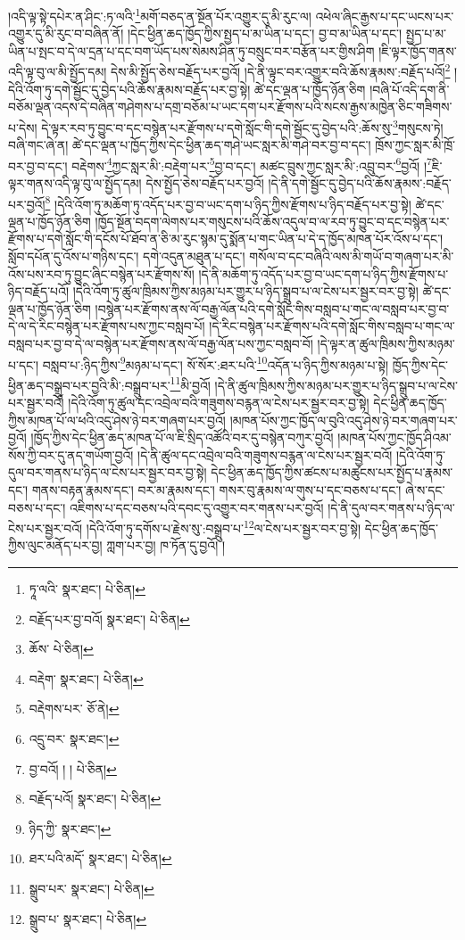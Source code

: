 །འདི་ལྟ་སྟེ་དཔེར་ན་ཤིང་:ཏ་ལའི་\footnote{ཏཱ་ལའི་  སྣར་ཐང་།  པེ་ཅིན། }མགོ་བཅད་ན་སྔོན་པོར་འགྱུར་དུ་མི་རུང་ལ། འཕེལ་ཞིང་རྒྱས་པ་དང་ཡངས་པར་འགྱུར་དུ་མི་རུང་བ་བཞིན་ནོ། །དེང་ཕྱིན་ཆད་ཁྱོད་ཀྱིས་སྤྱད་པ་མ་ཡིན་པ་དང་། བྱ་བ་མ་ཡིན་པ་དང་། སྤྱད་པ་མ་ཡིན་པ་སྤང་བ་དེ་ལ་དྲན་པ་དང་བག་ཡོད་པས་སེམས་ཤིན་ཏུ་བསྲུང་བར་བརྩོན་པར་གྱིས་ཤིག །ཇི་ལྟར་ཁྱོད་གནས་འདི་ལྟ་བུ་ལ་མི་སྤྱོད་དམ། དེས་མི་སྤྱོད་ཅེས་བརྗོད་པར་བྱའོ། །དེ་ནི་ལྟུང་བར་འགྱུར་བའི་ཆོས་རྣམས་:བརྗོད་པའོ།\footnote{བརྗོད་པར་བྱ་བའོ།  སྣར་ཐང་།  པེ་ཅིན། } །དེའི་འོག་ཏུ་དགེ་སྦྱོང་དུ་བྱེད་པའི་ཆོས་རྣམས་བརྗོད་པར་བྱ་སྟེ། ཚེ་དང་ལྡན་པ་ཁྱོད་ཉོན་ཅིག །བཞི་པོ་འདི་དག་ནི་བཅོམ་ལྡན་འདས་དེ་བཞིན་གཤེགས་པ་དགྲ་བཅོམ་པ་ཡང་དག་པར་རྫོགས་པའི་སངས་རྒྱས་མཁྱེན་ཅིང་གཟིགས་པ་དེས། དེ་ལྟར་རབ་ཏུ་བྱུང་བ་དང་བསྙེན་པར་རྫོགས་པ་དགེ་སློང་གི་དགེ་སྦྱོང་དུ་བྱེད་པའི་:ཆོས་སུ་\footnote{ཆོས་  པེ་ཅིན། }གསུངས་ཏེ། བཞི་གང་ཞེ་ན། ཚེ་དང་ལྡན་པ་ཁྱོད་ཀྱིས་དེང་ཕྱིན་ཆད་གཤེ་ཡང་སླར་མི་གཤེ་བར་བྱ་བ་དང་། ཁྲོས་ཀྱང་སླར་མི་ཁྲོ་བར་བྱ་བ་དང་། བརྡེགས་\footnote{བརྡེག་  སྣར་ཐང་།  པེ་ཅིན། }ཀྱང་སླར་མི་:བརྡེག་པར་\footnote{བརྡེགས་པར་  ཅོ་ནེ། }བྱ་བ་དང་། མཚང་བྲུས་ཀྱང་སླར་མི་:འབྲུ་བར་\footnote{འདྲུ་བར་  སྣར་ཐང་། }བྱའོ། །\footnote{བྱ་བའོ། ། །  པེ་ཅིན། }ཇི་ལྟར་གནས་འདི་ལྟ་བུ་ལ་སྤྱོད་དམ། དེས་སྤྱོད་ཅེས་བརྗོད་པར་བྱའོ། །དེ་ནི་དགེ་སྦྱོང་དུ་བྱེད་པའི་ཆོས་རྣམས་:བརྗོད་པར་བྱའོ།\footnote{བརྗོད་པའོ།  སྣར་ཐང་།  པེ་ཅིན། } །དེའི་འོག་ཏུ་མཆོག་ཏུ་འདོད་པར་བྱ་བ་ཡང་དག་པ་ཉིད་ཀྱིས་རྫོགས་པ་ཉིད་བརྗོད་པར་བྱ་སྟེ། ཚེ་དང་ལྡན་པ་ཁྱོད་ཉོན་ཅིག །ཁྱོད་སྔོན་བདག་ལེགས་པར་གསུངས་པའི་ཆོས་འདུལ་བ་ལ་རབ་ཏུ་བྱུང་བ་དང་བསྙེན་པར་རྫོགས་པ་དགེ་སློང་གི་དངོས་པོ་ཐོབ་ན་ཅི་མ་རུང་སྙམ་དུ་སྨོན་པ་གང་ཡིན་པ་དེ་ད་ཁྱོད་མཁན་པོར་འོས་པ་དང་། སློབ་དཔོན་དུ་འོས་པ་གཉིས་དང་། དགེ་འདུན་མཐུན་པ་དང་། གསོལ་བ་དང་བཞིའི་ལས་མི་གཡོ་བ་གཞག་པར་མི་འོས་པས་རབ་ཏུ་བྱུང་ཞིང་བསྙེན་པར་རྫོགས་སོ། །དེ་ནི་མཆོག་ཏུ་འདོད་པར་བྱ་བ་ཡང་དག་པ་ཉིད་ཀྱིས་རྫོགས་པ་ཉིད་བརྗོད་པའོ། །དེའི་འོག་ཏུ་ཚུལ་ཁྲིམས་ཀྱིས་མཉམ་པར་གྱུར་པ་ཉིད་སྒྲུབ་པ་ལ་ངེས་པར་སྦྱར་བར་བྱ་སྟེ། ཚེ་དང་ལྡན་པ་ཁྱོད་ཉོན་ཅིག །བསྙེན་པར་རྫོགས་ནས་ལོ་བརྒྱ་ལོན་པའི་དགེ་སློང་གིས་བསླབ་པ་གང་ལ་བསླབ་པར་བྱ་བ་དེ་ལ་དེ་རིང་བསྙེན་པར་རྫོགས་པས་ཀྱང་བསླབ་པོ། །དེ་རིང་བསྙེན་པར་རྫོགས་པའི་དགེ་སློང་གིས་བསླབ་པ་གང་ལ་བསླབ་པར་བྱ་བ་དེ་ལ་བསྙེན་པར་རྫོགས་ནས་ལོ་བརྒྱ་ལོན་པས་ཀྱང་བསླབ་བོ། །དེ་ལྟར་ན་ཚུལ་ཁྲིམས་ཀྱིས་མཉམ་པ་དང་། བསླབ་པ་:ཉིད་ཀྱིས་\footnote{ཉིད་ཀྱི་  སྣར་ཐང་། }མཉམ་པ་དང་། སོ་སོར་:ཐར་པའི་\footnote{ཐར་པའི་མདོ་  སྣར་ཐང་།  པེ་ཅིན། }འདོན་པ་ཉིད་ཀྱིས་མཉམ་པ་སྟེ། ཁྱོད་ཀྱིས་དེང་ཕྱིན་ཆད་བསྒྲུབ་པར་བྱའི་མི་:བསྒྲུབ་པར་\footnote{སྒྲུབ་པར་  སྣར་ཐང་།  པེ་ཅིན། }མི་བྱའོ། །དེ་ནི་ཚུལ་ཁྲིམས་ཀྱིས་མཉམ་པར་གྱུར་པ་ཉིད་སྒྲུབ་པ་ལ་ངེས་པར་སྦྱར་བའོ། །དེའི་འོག་ཏུ་ཚུལ་དང་འབྲེལ་བའི་གཟུགས་བརྙན་ལ་ངེས་པར་སྦྱར་བར་བྱ་སྟེ། དེང་ཕྱིན་ཆད་ཁྱོད་ཀྱིས་མཁན་པོ་ལ་ཕའི་འདུ་ཤེས་ཉེ་བར་གཞག་པར་བྱའོ། །མཁན་པོས་ཀྱང་ཁྱོད་ལ་བུའི་འདུ་ཤེས་ཉེ་བར་གཞག་པར་བྱའོ། །ཁྱོད་ཀྱིས་དེང་ཕྱིན་ཆད་མཁན་པོ་ལ་ཇི་སྲིད་འཚོའི་བར་དུ་བསྙེན་བཀུར་བྱའོ། །མཁན་པོས་ཀྱང་ཁྱོད་ཤིའམ་སོས་ཀྱི་བར་དུ་ནད་གཡོག་བྱའོ། །དེ་ནི་ཚུལ་དང་འབྲེལ་བའི་གཟུགས་བརྙན་ལ་ངེས་པར་སྦྱར་བའོ། །དེའི་འོག་ཏུ་དུལ་བར་གནས་པ་ཉིད་ལ་ངེས་པར་སྦྱར་བར་བྱ་སྟེ། དེང་ཕྱིན་ཆད་ཁྱོད་ཀྱིས་ཚངས་པ་མཚུངས་པར་སྤྱོད་པ་རྣམས་དང་། གནས་བརྟན་རྣམས་དང་། བར་མ་རྣམས་དང་། གསར་བུ་རྣམས་ལ་གུས་པ་དང་བཅས་པ་དང་། ཞེ་ས་དང་བཅས་པ་དང་། འཇིགས་པ་དང་བཅས་པའི་དབང་དུ་འགྱུར་བར་གནས་པར་བྱའོ། །དེ་ནི་དུལ་བར་གནས་པ་ཉིད་ལ་ངེས་པར་སྦྱར་བའོ། །དེའི་འོག་ཏུ་དགོས་པ་རྗེས་སུ་:བསྒྲུབ་པ་\footnote{སྒྲུབ་པ་  སྣར་ཐང་།  པེ་ཅིན། }ལ་ངེས་པར་སྦྱར་བར་བྱ་སྟེ། དེང་ཕྱིན་ཆད་ཁྱོད་ཀྱིས་ལུང་མནོད་པར་བྱ། ཀླག་པར་བྱ། ཁ་ཏོན་དུ་བྱའོ། །
